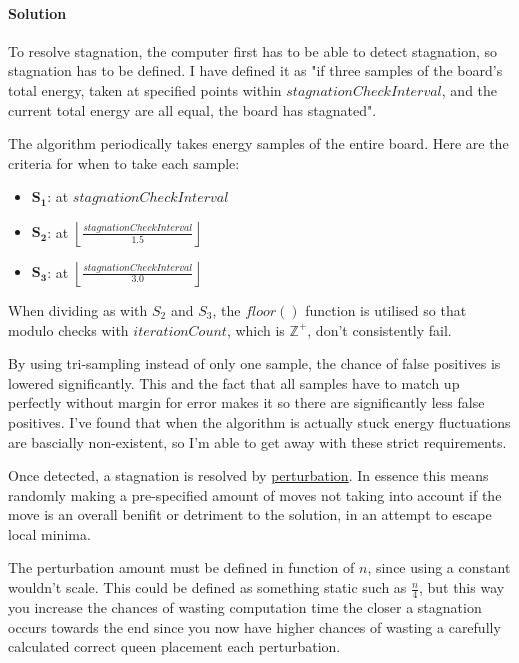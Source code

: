 \documentclass{article}
\begin{document}
\paragraph{Solution}
To resolve stagnation, the computer first has to be able to detect stagnation, so stagnation has to be defined.
I have defined it as "if three samples of the board's total energy, taken at specified points within $stagnationCheckInterval$,
and the current total energy are all equal, the board has stagnated".

The algorithm periodically takes energy samples of the entire board.
Here are the criteria for when to take each sample:
\begin{itemize}

    \item \(\mathbf{S_1}\): at \(stagnationCheckInterval\)
    \item \(\mathbf{S_2}\): at \( \left\lfloor \frac{stagnationCheckInterval}{1.5} \right\rfloor\)
    \item \(\mathbf{S_3}\): at \( \left\lfloor \frac{stagnationCheckInterval}{3.0} \right\rfloor\)
\end{itemize}

When dividing as with $S_2$ and $S_3$, the $floor()$ function is utilised so that modulo checks with $iterationCount$, which is $\mathbb{Z}^+$,
don't consistently fail.

By using tri-sampling instead of only one sample, the chance of false positives is lowered significantly.
This and the fact that all samples have to match up perfectly without margin for error makes it so there are significantly less false positives.
I've found that when the algorithm is actually stuck energy fluctuations are bascially non-existent, so I'm able to get away with these strict requirements.

Once detected, a stagnation is resolved by \href{https://en.wikipedia.org/wiki/Perturbation_theory}{perturbation}.
In essence this means randomly making a pre-specified amount of moves not taking into account if the move is an overall benifit or detriment to the solution,
in an attempt to escape local minima.

The perturbation amount must be defined in function of $n$, since using a constant wouldn't scale.
This could be defined as something static such as $\frac{n}{4}$,
but this way you increase the chances of wasting computation time the closer a stagnation occurs towards the end
since you now have higher chances of wasting a carefully calculated correct queen placement each perturbation.
\end{document}
